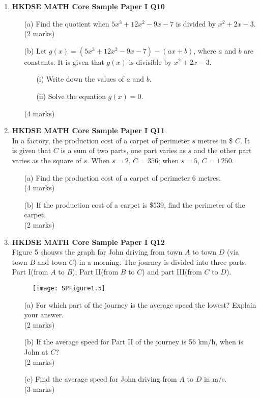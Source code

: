 \documentclass[12pt]{article}
\begin{document}
\begin{enumerate}
	\item \textbf{HKDSE MATH Core Sample Paper I Q10}
	\begin{enumerate}
		\item[(a)] Find the quotient when $5x^3 + 12x^2 - 9x - 7$ is divided by $x^2+2x-3$. \\(2 marks)
		\item[(b)] Let $g(x) = (5x^3 + 12x^2 - 9x - 7) - (ax+b)$, where $a$ and $b$ are constants. It is given that $g(x)$ is divisible by $x^2+2x-3$.
		\begin{enumerate}
			\item[(i)] Write down the values of $a$ and $b$.
			\item[(ii)] Solve the equation $g(x) = 0$.
		\end{enumerate}
		(4 marks)
	\end{enumerate} 

	\item \textbf{HKDSE MATH Core Sample Paper I Q11}\\
	In a factory, the production cost of a carpet of perimeter $s$ metres in \$ $C$. It is given that $C$ is a sum of two parts, one part varies as $s$ and the other part varies as the square of $s$. When $s = 2$, $C = 356$; when $s = 5$, $C = 1\,250$.
	\begin{enumerate}
		\item[(a)] Find the production cost of a carpet of perimeter 6 metres. \\(4 marks)
		\item[(b)] If the production cost of a carpet is \$539, find the perimeter of the carpet. \\(2 marks)
	\end{enumerate}

	\item \textbf{HKDSE MATH Core Sample Paper I Q12}\\
	Figure 5 shouws the graph for John driving from town $A$ to town $D$ (via town $B$ and town $C$) in a morning. The journey is divided into three parts: Part I(from $A$ to $B$), Part II(from $B$ to $C$) and part III(from $C$ to $D$).
	\begin{figure}[H]
		\centering
		\texttt{[image: SPFigure1.5]}
	\end{figure}
	\begin{enumerate}
		\item[(a)] For which part of the journey is the average speed the lowest? Explain your answer. \\(2 marks)
		\item[(b)] If the average speed for Part II of the journey is 56 km/h, when is John at $C$? \\(2 marks)
		\item[(c)] Find the average speed for John driving from $A$ to $D$ in m/s. \\(3 marks)
	\end{enumerate}


\end{enumerate}
\end{document}
